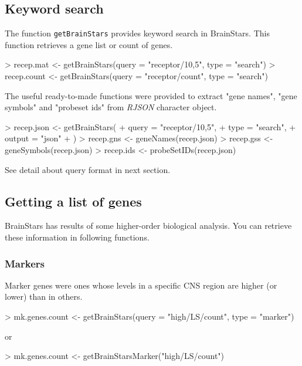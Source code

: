 \documentclass[12pt,fullpage]{article}
\newcommand{\Rfunction}[1]{{\texttt{#1}}}
\newcommand{\Rpackage}[1]{{\textit{#1}}}
\begin{document}
\subsection{Keyword search}
The function \Rfunction{getBrainStars} provides keyword search in BrainStars. This function retrieves a gene list or count of genes.
\begin{Schunk}
\begin{Sinput}
> recep.mat   <- getBrainStars(query = "receptor/10,5",  type = "search")
> recep.count <- getBrainStars(query = "receptor/count", type = "search")
\end{Sinput}
\end{Schunk}
The useful ready-to-made functions were provided to extract "gene names", "gene symbols" and "probeset ids" from \Rpackage{RJSON} character object.
\begin{Schunk}
\begin{Sinput}
> recep.json <- getBrainStars(
+   query  = "receptor/10,5",
+   type   = "search",
+   output = "json"
+ )
> recep.gns  <- geneNames(recep.json)
> recep.gss  <- geneSymbols(recep.json)
> recep.ids  <- probeSetIDs(recep.json)
\end{Sinput}
\end{Schunk}
See detail about query format in next section.

\subsection{Getting a list of genes}
BrainStars has results of some higher-order biological analysis. You can retrieve these information in following functions.

\subsubsection{Markers}
Marker genes were ones whose levels in a specific CNS region are higher (or lower) than in others.
\begin{Schunk}
\begin{Sinput}
> mk.genes.count <- getBrainStars(query = "high/LS/count", type = "marker")
\end{Sinput}
\end{Schunk}
or
\begin{Schunk}
\begin{Sinput}
> mk.genes.count <- getBrainStarsMarker("high/LS/count")
\end{Sinput}
\end{Schunk}
\end{document}
